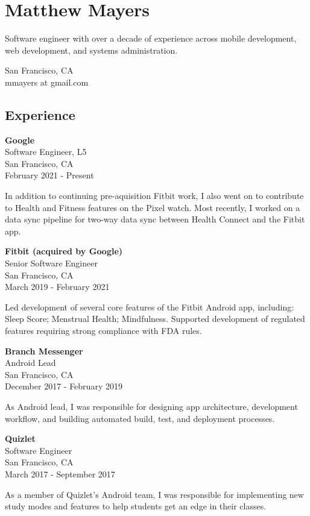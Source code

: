 \documentclass[
]{article}
\author{}
\date{}
\begin{document}
\section{Matthew Mayers}\label{matthew-mayers}

Software engineer with over a decade of experience across mobile
development, web development, and systems administration.

San Francisco, CA\\
mmayers at gmail.com

\subsection{Experience}\label{experience}

\textbf{Google}\\
Software Engineer, L5\\
San Francisco, CA\\
February 2021 - Present

In addition to continuing pre-aquisition Fitbit work, I also went on to
contribute to Health and Fitness features on the Pixel watch. Most
recently, I worked on a data sync pipeline for two-way data sync between
Health Connect and the Fitbit app.

\textbf{Fitbit (acquired by Google)}\\
Senior Software Engineer\\
San Francisco, CA\\
March 2019 - February 2021

Led development of several core features of the Fitbit Android app,
including: Sleep Score; Menstrual Health; Mindfulness. Supported
development of regulated features requiring strong compliance with FDA
rules.

\textbf{Branch Messenger}\\
Android Lead\\
San Francisco, CA\\
December 2017 - February 2019

As Android lead, I was responsible for designing app architecture,
development workflow, and building automated build, test, and deployment
processes.

\textbf{Quizlet}\\
Software Engineer\\
San Francisco, CA\\
March 2017 - September 2017

As a member of Quizlet's Android team, I was responsible for
implementing new study modes and features to help students get an edge
in their classes.
\end{document}
